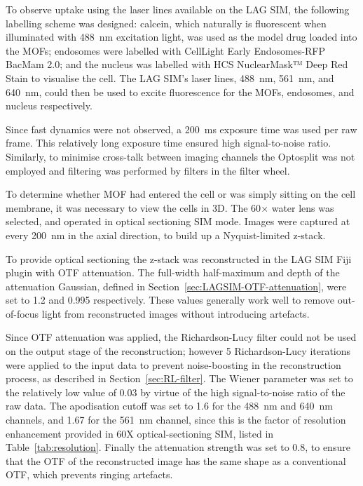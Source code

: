 To observe uptake using the laser lines available on the LAG SIM, the following labelling scheme was designed:
calcein, which naturally is fluorescent when illuminated with \SI{488}{\nano\metre} excitation light, was used as the model drug loaded into the MOFs;
endosomes were labelled with CellLight Early Endosomes-RFP BacMam 2.0; and the nucleus was labelled with HCS NuclearMask™ Deep Red Stain to visualise the cell.
The LAG SIM's laser lines, \SI{488}{\nano\metre}, \SI{561}{\nano\metre}, and \SI{640}{\nano\metre}, could then be used to excite fluorescence for the MOFs, endosomes, and nucleus respectively.

Since fast dynamics were not observed, a \SI{200}{\milli\second} exposure time was used per raw frame.
This relatively long exposure time ensured high signal-to-noise ratio.
Similarly, to minimise cross-talk between imaging channels the Optosplit was not employed and filtering was performed by filters in the filter wheel.

To determine whether MOF had entered the cell or was simply sitting on the cell membrane, it was necessary to view the cells in 3D.
The 60$\times$ water lens was selected, and operated in optical sectioning SIM mode.
Images were captured at every \SI{200}{\nano\metre} in the axial direction, to build up a Nyquist-limited z-stack.

To provide optical sectioning the z-stack was reconstructed in the LAG SIM Fiji plugin with OTF attenuation.
The full-width half-maximum and depth of the attenuation Gaussian, defined in Section~\ref{sec:LAGSIM-OTF-attenuation}, were set to 1.2 and 0.995 respectively.
These values generally work well to remove out-of-focus light from reconstructed images without introducing artefacts.

Since OTF attenuation was applied, the Richardson-Lucy filter could not be used on the output stage of the reconstruction; however 5 Richardson-Lucy iterations were applied to the input data to prevent noise-boosting in the reconstruction process, as described in Section~\ref{sec:RL-filter}.
The Wiener parameter was set to the relatively low value of 0.03 by virtue of the high signal-to-noise ratio of the raw data.
The apodisation cutoff was set to 1.6 for the \SI{488}{\nano\metre} and \SI{640}{\nano\metre} channels, and 1.67 for the \SI{561}{\nano\metre} channel, since this is the factor of resolution enhancement provided in 60X optical-sectioning SIM, listed in Table~\ref{tab:resolution}.
Finally the attenuation strength was set to 0.8, to ensure that the OTF of the reconstructed image has the same shape as a conventional OTF, which prevents ringing artefacts.

